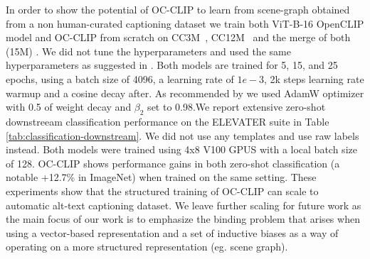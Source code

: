 { In order to show the potential of OC-CLIP to learn from scene-graph obtained from a non human-curated captioning dataset we train both ViT-B-16 OpenCLIP model and OC-CLIP from scratch on CC3M~\citep{sharma-etal-2018-conceptual}, CC12M~\citep{changpinyo2021cc12m} and the merge of both (15M) . We did not tune the hyperparameters and used the same hyperparameters as suggested in \citep{mu2021slipselfsupervisionmeetslanguageimage}. Both models are trained for 5, 15, and 25 epochs, using a batch size of 4096, a learning rate of $1e-3$, 2k steps learning rate warmup and a cosine decay after. As recommended by \citet{mu2021slipselfsupervisionmeetslanguageimage} we used AdamW optimizer with 0.5 of weight decay and $\beta_2$ set to 0.98.We report extensive zero-shot downstreeam classification performance on the ELEVATER \citep{li2022elevaterbenchmarktoolkitevaluating} suite in Table \ref{tab:classification-downstream}. We did not use any templates and use raw labels instead. Both models were trained using 4x8 V100 GPUS with a local batch size of 128. OC-CLIP shows  performance gains in both zero-shot classification (a notable +12.7\% in ImageNet) when trained on the same setting.  These experiments show that the structured training of OC-CLIP can scale to automatic alt-text captioning dataset. We leave further scaling for future work as the main focus of our work is to emphasize the binding problem that arises when using a vector-based representation and a set of inductive biases  as a way of operating on a more structured representation (eg. scene graph).
\begin{table*}
\setlength{\tabcolsep}{2pt}
\linespread{1}
\scriptsize
\begin{adjustbox}{width=\textwidth}
\end{adjustbox}
\end{table*}}
